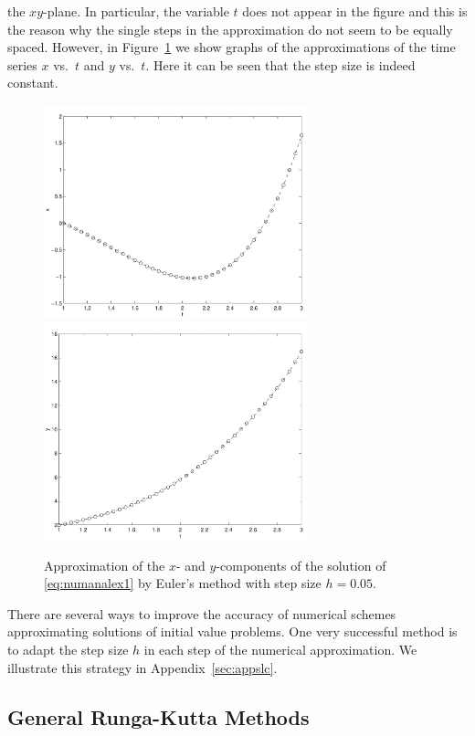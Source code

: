 \documentclass{ximera}
\begin{document}
the $xy$-plane.
In particular, the variable $t$ does not appear in the figure 
and this is the reason why the single steps in the approximation
do not seem to be equally spaced.  However, in
Figure~\ref{fig:sysEul2} we show graphs of the approximations
of the time series $x$ vs.\ $t$ and $y$ vs.\ $t$. Here 
it can be seen that the step size is indeed constant.
\begin{figure}[htb]
   \centerline{%
   \includegraphics[width=3in]{../figures/eulsys2.pdf}
   \includegraphics[width=3in]{../figures/eulsys3.pdf}}
   \caption{Approximation of the $x$- and $y$-components
   of the solution of \protect\eqref{eq:numanalex1} by Euler's method
   with step size $h=0.05$.}
   \label{fig:sysEul2}
\end{figure}


There are several ways to improve the accuracy of 
numerical schemes approximating solutions of initial value problems. 
One very successful method is to adapt the step size $h$ in each
step of the numerical approximation.  We illustrate this
strategy in Appendix~\ref{sec:appslc}.


\subsection*{General Runga-Kutta Methods}
\end{document}
